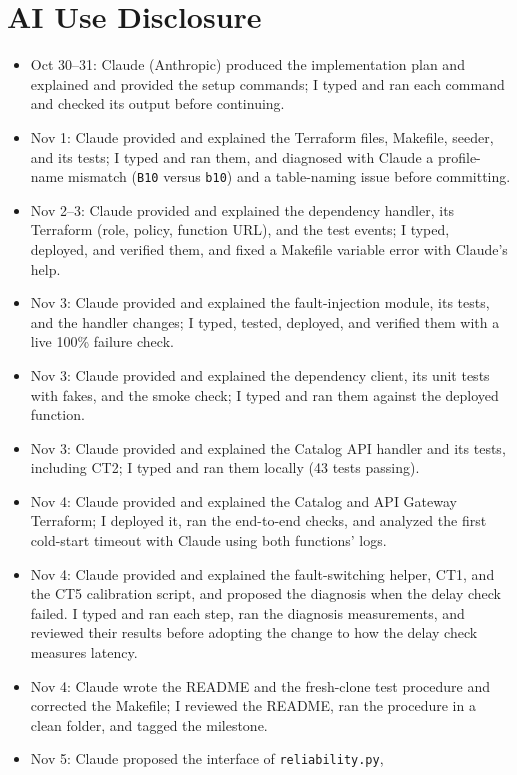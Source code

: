 \documentclass[10pt]{article}
\begin{document}
\section{AI Use Disclosure}
\begin{itemize}
  \item Oct 30--31: Claude (Anthropic) produced the implementation plan and
  explained and provided the setup commands; I typed and ran each command and
  checked its output before continuing.
  \item Nov 1: Claude provided and explained the Terraform files, Makefile,
  seeder, and its tests; I typed and ran them, and diagnosed with Claude a
  profile-name mismatch (\texttt{B10} versus \texttt{b10}) and a table-naming
  issue before committing.
  \item Nov 2--3: Claude provided and explained the dependency handler, its
  Terraform (role, policy, function URL), and the test events; I typed, deployed,
  and verified them, and fixed a Makefile variable error with Claude's help.
  \item Nov 3: Claude provided and explained the fault-injection module, its
  tests, and the handler changes; I typed, tested, deployed, and verified them
  with a live 100\% failure check.
  \item Nov 3: Claude provided and explained the dependency client, its unit
  tests with fakes, and the smoke check; I typed and ran them against the
  deployed function.
  \item Nov 3: Claude provided and explained the Catalog API handler and its
  tests, including CT2; I typed and ran them locally (43 tests passing).
  \item Nov 4: Claude provided and explained the Catalog and API Gateway
  Terraform; I deployed it, ran the end-to-end checks, and analyzed the first
  cold-start timeout with Claude using both functions' logs.
  \item Nov 4: Claude provided and explained the fault-switching helper, CT1,
  and the CT5 calibration script, and proposed the diagnosis when the delay
  check failed. I typed and ran each step, ran the diagnosis measurements, and
  reviewed their results before adopting the change to how the delay check
  measures latency.
  \item Nov 4: Claude wrote the README and the fresh-clone test procedure and
  corrected the Makefile; I reviewed the README, ran the procedure in a clean
  folder, and tagged the milestone.
  \item Nov 5: Claude proposed the interface of \texttt{reliability.py},

\end{itemize}
\end{document}
